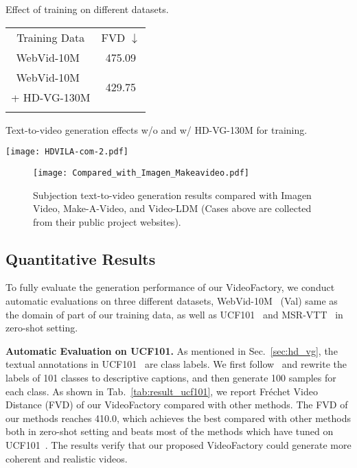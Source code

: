 \documentclass{article}
\begin{document}
\begin{minipage}[t]{\textwidth}
\centering
\footnotesize
\begin{minipage}[t]{0.29\textwidth}
\makeatletter{}
\centering
    \caption{Effect of training on different datasets.}
    \renewcommand{\arraystretch}{1.2}
        \begin{tabular}{c c}
        \Xhline{1.2pt}
         Training Data        & FVD $\downarrow$ \\
        \Xhline{0.4pt}
         WebVid-10M~\cite{bain2021frozen}  & 475.09 \\
         \Xhline{0.4pt}
         WebVid-10M~\cite{bain2021frozen} & \multirow{2}{*}{429.75} \\
         + HD-VG-130M    &  \\
        \Xhline{1.2pt}
        \end{tabular}\label{tab:aba_dataset}
    \end{minipage}
\hspace{0.01\textwidth}
\begin{minipage}[t]{0.67\textwidth}
\makeatletter{}
\centering
    \caption{Text-to-video generation effects w/o and w/ HD-VG-130M for training.}
    \centering
    \texttt{[image: HDVILA-com-2.pdf]}
    \label{fig:com_w_wo_HD}
\end{minipage}
\end{minipage}


\begin{figure}[t]
    \centering
    \texttt{[image: Compared\_with\_Imagen\_Makeavideo.pdf]}
    \caption{Subjection text-to-video generation results compared with Imagen Video, Make-A-Video, and Video-LDM (Cases above are collected from their public project websites).}
    \label{fig:com_imagen_makeavideo}
    \vspace{-7mm}
\end{figure}


\subsection{Quantitative Results}
To fully evaluate the generation performance of our VideoFactory, we conduct automatic evaluations on three different datasets, 
WebVid-10M~\cite{bain2021frozen} (Val) same as the domain of part of our training data, as well as UCF101~\cite{soomro2012ucf101} and MSR-VTT~\cite{xu2016msr} in zero-shot setting. 


\noindent \textbf{Automatic Evaluation on UCF101.} 
As mentioned in Sec.~\ref{sec:hd_vg}, the textual annotations in UCF101~\cite{soomro2012ucf101} are class labels. We first follow~\cite{2022_VDM, MakeAVideo} and rewrite the labels of 101 classes to descriptive captions, and then generate 100 samples for each class. As shown in Tab.~\ref{tab:result_ucf101}, we report Fréchet Video Distance (FVD) of our VideoFactory compared with other methods. The FVD of our methods reaches 410.0, which achieves the best compared with other methods both in zero-shot setting and beats most of the methods which have tuned on UCF101~\cite{soomro2012ucf101}. The results verify that our proposed VideoFactory could generate more coherent and realistic videos.
\end{document}
